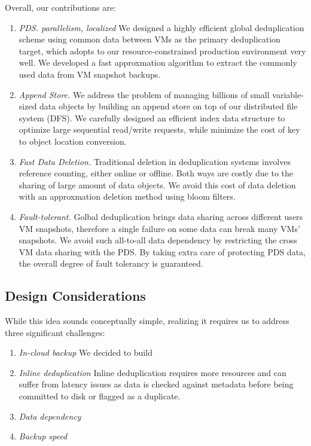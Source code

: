 Overall, our contributions are:
\begin{enumerate}
\item {\em PDS. parallelism, localized}
We designed a highly efficient global deduplication scheme using common data between VMs as the primary
deduplication target, which adopts to our resource-constrained production environment very well. We developed a fast
approxmation algorithm to extract the commonly used data from VM snapshot backups.

\item {\em Append Store.}
We address the problem of managing billions of small variable-sized data objects by building an append store
on top of our distributed file system (DFS). We carefully designed an efficient index data structure to 
optimize large sequential read/write requests, while minimize the cost of key to object location conversion.

\item {\em Fast Data Deletion.}
Traditional deletion in deduplication systems involves reference counting, either online or offline. Both ways
are costly due to the sharing of large amount of data objects.
We avoid this cost of data deletion with an approxmation deletion method using bloom filters.

\item {\em Fault-tolerant.}
Golbal deduplication brings data sharing across different users VM snapshots, therefore a single failure
on some data can break many VMs' snapshots. We avoid such all-to-all data dependency by restricting
the cross VM data sharing with the PDS. By taking extra care of protecting PDS data, 
the overall degree of fault tolerancy is guaranteed.

\end{enumerate}

\subsection{Design Considerations}
While this idea sounds conceptually simple, realizing it requires us to address three
significant challenges:
\begin{enumerate}
\item {\em In-cloud backup}
We decided to build 
\item {\em Inline deduplication}
Inline deduplication requires more resources and can suffer from latency issues as data is checked against metadata before being committed to disk or flagged as a duplicate.
\item {\em Data dependency}

\item {\em Backup speed}

\end{enumerate}

